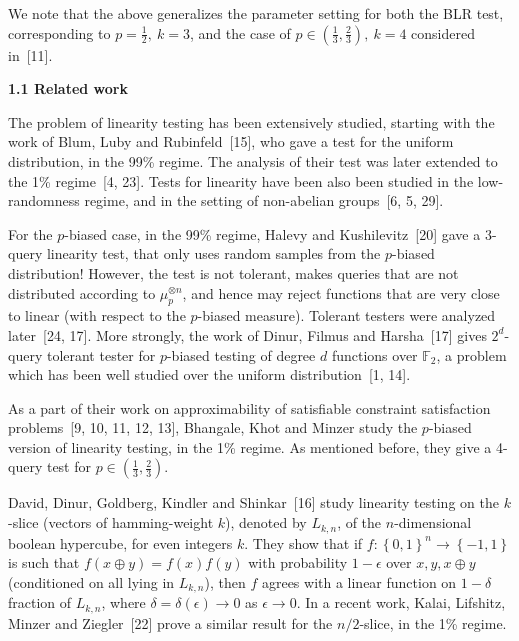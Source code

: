 


We note that the above generalizes the parameter setting for both the BLR test, corresponding to $p=\frac{1}{2},\ k=3$, and the case of $p\in\left(\frac{1}{3},\frac{2}{3}\right),\ k=4$ considered in [11].\par




\par\medskip\noindent\textbf{
1.1 Related work}\par




The problem of linearity testing has been extensively studied, starting with the work of Blum, Luby and Rubinfeld [15], who gave a test for the uniform distribution, in the 99\% regime.
The analysis of their test was later extended to the 1\% regime [4, 23].
Tests for linearity have been also been studied in the low-randomness regime, and in the setting of non-abelian groups [6, 5, 29].\par




For the $p$-biased case, in the 99\% regime, Halevy and Kushilevitz [20] gave a 3-query linearity test, that only uses random samples from the $p$-biased distribution!
However, the test is not tolerant, makes queries that are not distributed according to $\mu_{p}^{\otimes n}$, and hence may reject functions that are very close to linear (with respect to the $p$-biased measure).
Tolerant testers were analyzed later [24, 17].
More strongly, the work of Dinur, Filmus and Harsha [17] gives $2^{d}$-query tolerant tester for $p$-biased testing of degree $d$ functions over $\mathbb{F}_{2}$, a problem which has been well studied over the uniform distribution [1, 14].\par




As a part of their work on approximability of satisfiable constraint satisfaction problems [9, 10, 11, 12, 13], Bhangale, Khot and Minzer study the $p$-biased version of linearity testing, in the 1\% regime.
As mentioned before, they give a 4-query test for $p\in\left(\frac{1}{3},\frac{2}{3}\right)$.\par




David, Dinur, Goldberg, Kindler and Shinkar [16] study linearity testing on the $k$-slice (vectors of hamming-weight $k$), denoted by $L_{k,n}$, of the $n$-dimensional boolean hypercube, for even integers $k$.
They show that if $f:\left\{0,1\right\}^{n}\to\left\{-1,1\right\}$ is such that $f(x\oplus y)=f(x)f(y)$ with probability $1-\epsilon$ over $x,y,x\oplus y$ (conditioned on all lying in $L_{k,n}$), then $f$ agrees with a linear function on $1-\delta$ fraction of $L_{k,n}$, where $\delta=\delta(\epsilon)\to 0$ as $\epsilon\to 0$.
In a recent work, Kalai, Lifshitz, Minzer and Ziegler [22] prove a similar result for the $n/2$-slice, in the 1\% regime.\par





